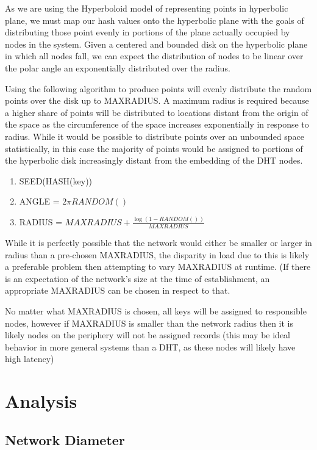 As we are using the Hyperboloid model of representing points in hyperbolic plane, we must map our hash values onto the hyperbolic plane with the goals of distributing those point evenly in portions of the plane actually occupied by nodes in the system.
Given a centered and bounded disk on the hyperbolic plane in which all nodes fall, we can expect the distribution of nodes to be linear over the polar angle an exponentially distributed over the radius. 


Using the following algorithm to produce points will evenly distribute the random points over the disk up to MAXRADIUS. A maximum radius is required because a higher share of points will be distributed to locations distant from the origin of the space as the circumference of the space increases exponentially in response to radius. While it would be possible to distribute points over an unbounded space statistically, in this case the majority of points would be assigned to portions of the hyperbolic disk increasingly distant from the embedding of the DHT nodes.  
\begin{enumerate}
\item SEED(HASH(key))
\item ANGLE = $2\pi{} \dot{} \mathit{RANDOM()}$
\item RADIUS = $\mathit{MAXRADIUS} + \frac{\log{(1-{\mathit{RANDOM()}})}}{\mathit{MAXRADIUS}}$
\end{enumerate}


While it is perfectly possible that the network would either be smaller or larger in radius than a pre-chosen MAXRADIUS, the disparity in load due to this is likely a preferable problem then attempting to vary MAXRADIUS at runtime. (If there is an expectation of the network's size at the time of establishment, an appropriate MAXRADIUS can be chosen in respect to that.

No matter what MAXRADIUS is chosen, all keys will be assigned to responsible nodes, however if MAXRADIUS is smaller than the network radius then it is likely nodes on the periphery will not be assigned records (this may be ideal behavior in more general systems than a DHT, as these nodes will likely have high latency)

\section{Analysis}

\subsection{Network Diameter}

